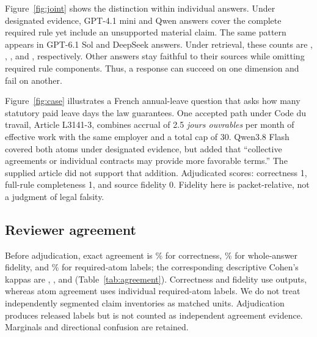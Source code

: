 \documentclass[11pt]{article}
\DeclareRobustCommand{\claim}[2]{#2}
\begin{document}
\claim{JOINTFAIL}{Figure~\ref{fig:joint} shows the distinction within individual answers. Under designated evidence, \RODUnsupported{} GPT-4.1 mini and \RQDUnsupported{} Qwen answers cover the complete required rule yet include an unsupported material claim. The same pattern appears in \RSDUnsupported{} GPT-6.1 Sol and \RDDUnsupported{} DeepSeek answers. Under retrieval, these counts are \ROCUnsupported{}, \RQCUnsupported{}, \RSCUnsupported{}, and \RDCUnsupported{}, respectively. Other answers stay faithful to their sources while omitting required rule components. Thus, a response can succeed on one dimension and fail on another.}

\begin{samepage}
\claim{CASE}{Figure~\ref{fig:case} illustrates a French annual-leave question that asks how many statutory paid leave days the law guarantees. One accepted path under Code du travail, Article L3141-3, combines accrual of 2.5 \emph{jours ouvrables} per month of effective work with the same employer and a total cap of 30. Qwen3.8 Flash covered both atoms under designated evidence, but added that ``collective agreements or individual contracts may provide more favorable terms.'' The supplied article did not support that addition. Adjudicated scores: correctness 1, full-rule completeness 1, and source fidelity 0. Fidelity here is packet-relative, not a judgment of legal falsity.}
\par\end{samepage}

\subsection{Reviewer agreement}
\claim{RELIABILITY}{Before adjudication, exact agreement is \RAgreeCorrect\% for correctness, \RAgreeFidelity\% for whole-answer fidelity, and \RAgreeAtom\% for required-atom labels; the corresponding descriptive Cohen's kappas are \RKappaCorrect{}, \RKappaFidelity{}, and \RKappaAtom{} (Table~\ref{tab:agreement}). Correctness and fidelity use outputs, whereas atom agreement uses individual required-atom labels. We do not treat independently segmented claim inventories as matched units. Adjudication produces released labels but is not counted as independent agreement evidence. Marginals and directional confusion are retained.}

\begin{table}[!ht]
\centering\small

\caption{\claim{CAPAGREE}{Agreement before adjudication. Correctness and fidelity use outputs as units; atom agreement uses required-atom labels. The pooled review slots span jurisdiction-specific teams.}}
\label{tab:agreement}
\end{table}
\end{document}

